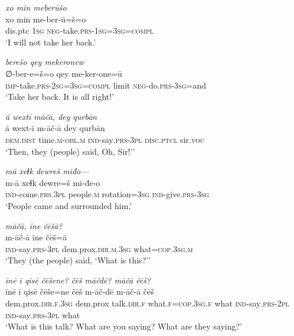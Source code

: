 \ea \label{ŽP.208}
\textit{xo min meberūšo} \\ 
\gll xo min me-ber-ū=š=o \\ 
 dis.ptc \textsc{1sg} \textsc{neg-}take\textsc{.prs}\textsc{-\textsc{1sg}}\textsc{=3sg}\textsc{=compl} \\ 
\glt `I will not take her back.'
\z 
 
\ea \label{ŽP.212}
\textit{berešo qey mekeronew} \\ 
\gll ∅-ber-e=š=o qey me-ker-one=ū \\ 
 \textsc{imp-}take\textsc{.prs}-\textsc{2sg}\textsc{=3sg}\textsc{=compl} limit \textsc{neg-}do\textsc{.prs}\textsc{-3sg}=and \\ 
\glt `Take her back. It is all right!'
\z 
 
\ea \label{ŽP.220}
\textit{ā wextī māčā, dey qurbān} \\ 
\gll ā wext-ī m-āč-ā dey qurbān \\ 
 \textsc{dem.dist} time\textsc{.m}\textsc{-obl}\textsc{.m} \textsc{ind-}say\textsc{.prs}\textsc{-3pl} \textsc{disc.ptcl} sir.\textsc{voc} \\ 
\glt `Then, they (people) said, Oh, Sir!’'
\z 
 
\ea \label{ŽP.221}
\textit{mā xeɫk dewreš miđo—} \\ 
\gll m-ā xeɫk dewre=š mi-đe-o \\ 
 \textsc{ind-}come\textsc{.prs}\textsc{.3pl} people\textsc{.m} rotation\textsc{=3sg} \textsc{ind-}give\textsc{.prs}\textsc{-3sg} \\ 
\glt `People came and surrounded him.'
\z 
 
\ea \label{ŽP.222}
\textit{māčā, īne čēšā?} \\ 
\gll m-āč-ā īne čēš=ā \\ 
 \textsc{ind-}say\textsc{.prs}\textsc{-3pl} dem.prox\textsc{.dir}\textsc{.m}\textsc{.3sg} what\textsc{=cop}\textsc{.3sg}\textsc{.m} \\ 
\glt `They (the people) said, ‘What is this?’'
\z 
 
\ea \label{ŽP.223}
\textit{īnē ī qisē čēšene? čēš māčdē? māčā čēš?} \\ 
\gll īnē ī qisē čēše=ne čēš m-āč-dē m-āč-ā čēš \\ 
 dem.prox\textsc{.dir}\textsc{.f}\textsc{.3sg} dem.prox talk\textsc{.dir}\textsc{.f} what\textsc{.f}\textsc{=cop}\textsc{.3sg}\textsc{.f} what \textsc{ind-}say\textsc{.prs}-\textsc{2pl} \textsc{ind-}say\textsc{.prs}\textsc{-3pl} what \\ 
\glt `What is this talk? What are you saying? What are they saying?'
\z 
 
